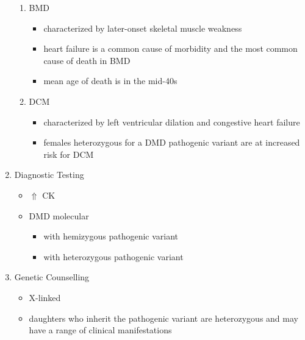 \documentclass[12pt]{scrartcl}
\begin{document}
\begin{enumerate}
\begin{enumerate}
\item BMD
\label{sec:org4e95545}
\begin{itemize}
\item characterized by later-onset skeletal muscle weakness
\item heart failure is a common cause of morbidity and the most common
cause of death in BMD
\item mean age of death is in the mid-40s
\end{itemize}
\item DCM
\label{sec:org4e464ce}
\begin{itemize}
\item characterized by left ventricular dilation and congestive heart
failure
\item females heterozygous for a DMD pathogenic variant are at increased
risk for DCM
\end{itemize}
\end{enumerate}
\item Diagnostic Testing
\label{sec:org6d2ef08}
\begin{itemize}
\item \(\Uparrow\) CK
\item DMD molecular
\begin{itemize}
\item \male with hemizygous pathogenic variant
\item \female with heterozygous pathogenic variant
\end{itemize}
\end{itemize}
\item Genetic Counselling
\label{sec:orgeb41f38}
\begin{itemize}
\item X-linked
\item daughters who inherit the pathogenic variant are heterozygous and
may have a range of clinical manifestations
\end{itemize}
\end{enumerate}
\end{document}
